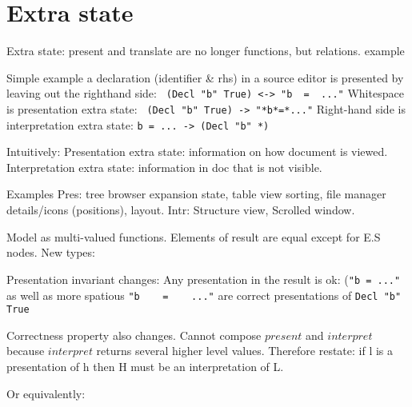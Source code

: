 %																
%																
%																
\section{Extra state}


Extra state: present and translate are no longer functions, but relations. example

\bl
\* Simple example a declaration (identifier \& rhs) in a source editor is presented by leaving out the righthand side:
\* \verb| (Decl "b" True) <-> "b  =  ..."|
\* Whitespace is presentation extra state: \verb| (Decl "b" True) -> "*b*=*..."|
\* Right-hand side is interpretation extra state: \verb|b = ... -> (Decl "b" *)|
\el

\bl
\* Intuitively: Presentation extra state: information on how document is viewed. 
\* Interpretation extra state: information in doc that is not visible. 
\el

\bl
\* Examples Pres: tree browser expansion state, table view sorting, file manager details/icons (positions), layout.
\* Intr: Structure view, Scrolled window.
\el

\bl
\* Model as multi-valued functions. 
\* Elements of result are equal except for E.S nodes.
\* New types:
\el



\bl
\* Presentation invariant changes: Any presentation in the result is ok: 
\* (\verb|"b = ..."| as well as more spatious \verb|"b    =    ..."| are correct presentations of \verb|Decl "b" True|
\el



\bl
\* Correctness property also changes. 
\* Cannot compose $present$ and $interpret$ because $interpret$ returns several higher level values.
\* Therefore restate: if l is a presentation of h then H must be an interpretation of L.
\el



Or equivalently:

